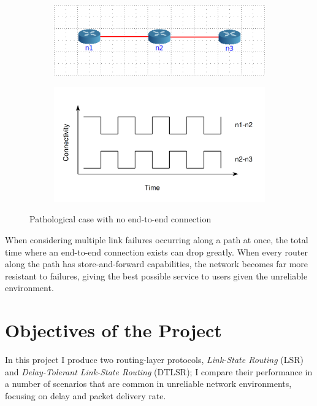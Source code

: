 \documentclass[withindex,glossary,openany]{cam-thesis}
\begin{document}
\begin{figure}[H]
\centering
\begin{subfigure}{.45\textwidth}
  \centering
  \includegraphics[width=1\linewidth]{pathalogical_topology}
  \label{fig:pathalogical_topology}
\end{subfigure}%
\begin{subfigure}{.55\textwidth}
  \centering
  \includegraphics[width=1\linewidth]{pathalogical_graph}
  \label{fig:pathalogical_graph}
\end{subfigure}
\caption{Pathological case with no end-to-end connection}
\label{fig:pathalogical}
\end{figure}

When considering multiple link failures occurring along a path at once, the total time where an end-to-end connection exists can drop greatly. When every router along the path has store-and-forward capabilities, the network becomes far more resistant to failures, giving the best possible service to users given the unreliable environment.

\section{Objectives of the Project}

In this project I produce two routing-layer protocols, \textit{Link-State Routing} (LSR) and \textit{Delay-Tolerant Link-State Routing} (DTLSR); I compare their performance in a number of scenarios that are common in unreliable network environments, focusing on delay and packet delivery rate.
\end{document}
